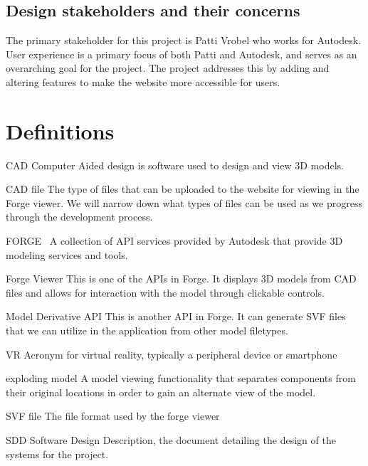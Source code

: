 \documentclass[letterpaper, 10pt, draftclsnofoot, compsoc, onecolumn]{IEEEtran}
\begin{document}
\subsection{Design stakeholders and their concerns}
	The primary stakeholder for this project is Patti Vrobel who works for Autodesk. User experience is a primary focus of both Patti and Autodesk, and serves as an overarching goal for the project. The project addresses this by adding and altering features to make the website more accessible for users.




\section{Definitions}
\begin{description}
	\item{CAD} Computer Aided design is software used to design and view 3D models.

	\item{CAD file} The type of files that can be uploaded to the website for viewing in the Forge viewer. 
	We will  narrow down what types of files can be used as we progress through the development process.

	\item{FORGE}~\cite{forge2016} A collection of API services provided by Autodesk that provide 3D modeling services and tools.

	\item{Forge Viewer} This is one of the APIs in Forge. It displays 3D models from CAD files and allows for interaction with the model through clickable controls.
	
	\item{Model Derivative API} This is another API in Forge. It can generate SVF files that we can utilize in the application from other model filetypes.
	
	\item{VR} Acronym for virtual reality, typically a peripheral device or smartphone

	\item{exploding model} A model viewing functionality that separates components from their original locations in order to gain an alternate view of the model.

	\item{SVF file} The file format used by the forge viewer
	
	\item{SDD} Software Design Description, the document detailing the design of the systems for the project.
	
\end{description} 
\end{document}
